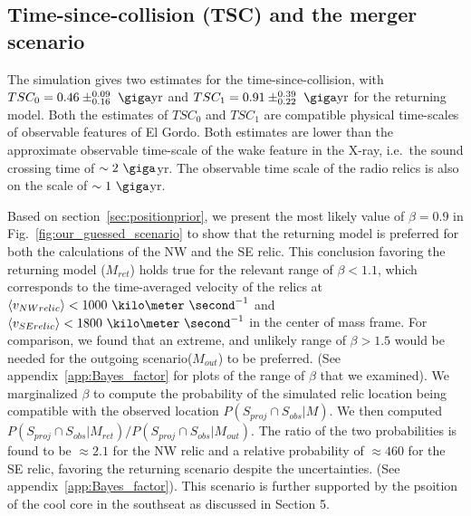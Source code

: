 \subsection{Time-since-collision (TSC) and the merger scenario}
The simulation gives two estimates for
the time-since-collision, with $TSC_0 = 0.46\pm^{0.09}_{0.16}~\giga \text{yr}$
and $TSC_1 =0.91\pm^{0.39}_{0.22}~\giga\text{yr}$ for the returning model. Both the estimates of
$TSC_0$ and $TSC_1$ are compatible physical time-scales of observable
features of El Gordo. Both estimates are lower than the approximate
observable time-scale of the wake feature in the X-ray, i.e.\ the sound
crossing time of $\sim2~\giga$yr. The observable time scale of the radio
relics is also on the scale of $\sim1~\giga$yr.\par 
Based on section~\ref{sec:positionprior}, we present the most likely
value of $\beta = 0.9$ in Fig.~\ref{fig:our_guessed_scenario} to show that
the returning model is preferred for both the calculations of the NW and the
SE relic. This conclusion favoring the returning model ($M_{ret}$) holds true for the
relevant range of $  \beta
< 1.1$, which corresponds to the time-averaged velocity of the relics at
$\langle v_{NW relic} \rangle < 1000~\kilo\meter~\second^{-1}$ and $\langle
v_{SE relic} \rangle < 1800~\kilo\meter~\second^{-1}$ in the center of
mass frame. For comparison, we found that an extreme, and unlikely
range of $\beta > 1.5$ would be needed for the outgoing scenario($M_{out}$) to be
preferred. (See appendix~\ref{app:Bayes_factor} for plots of the range
of $\beta$ that we examined). We marginalized $\beta$ to compute the
probability of the simulated relic location being compatible with the
observed location $P(S_{proj} \cap S_{obs}| M)$. We then computed   
$P(S_{proj} \cap S_{obs} | M_{ret}) / P(S_{proj} \cap S_{obs} | M_{out})$. 
The ratio of the two probabilities is found to be $\approx
2.1$ for the NW relic and a relative probability of $\approx 460$ for the
SE relic, favoring the returning scenario despite the
uncertainties. (See appendix~\ref{app:Bayes_factor}). This scenario is
further supported by the psoition of the cool core in the southseat as
discussed in Section 5.  
